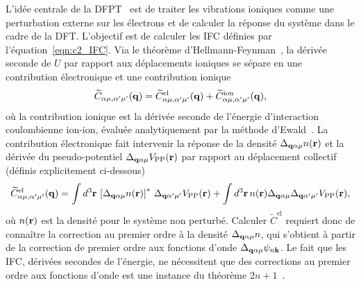 L'idée centrale de la DFPT~\cite{baroniPhononsRelatedCrystal2001a,baroniGreensfunctionApproachLinear1987,gonzeDensityfunctionalApproachNonlinearresponse1989,savrasovLinearresponseTheoryLattice1996} est de traiter les vibrations ioniques comme une perturbation externe sur les électrons et de calculer la réponse du système dans le cadre de la DFT. L'objectif est de calculer les IFC définies par l'équation~\eqref{eqn:c2_IFC}. Via le théorème d'Hellmann-Feynman~\cite{EinfuhrungQuantenchemieHellmann1941,feynmanForcesMolecules1939}, la dérivée seconde de $U$ par rapport aux déplacements ioniques se sépare en une contribution électronique et une contribution ionique
\begin{equation}
    \widetilde{C}_{\alpha\mu,\alpha'\mu'}(\mathbf{q}) = \widetilde{C}^\text{el}_{\alpha\mu,\alpha'\mu'}(\mathbf{q}) + \widetilde{C}^{\text{ion}}_{\alpha\mu,\alpha'\mu'}(\mathbf{q}),
    \label{eqn:IFCq}
\end{equation}
où la contribution ionique est la dérivée seconde de l'énergie d'interaction coulombienne ion-ion, évaluée analytiquement par la méthode d'Ewald~\cite{ewaldBerechnungOptischerUnd1921}. La contribution électronique fait intervenir la réponse de la densité $\Delta_{\mathbf{q}\alpha\mu}n(\mathbf{r})$ et la dérivée du pseudo-potentiel $\Delta_{\mathbf{q}\alpha\mu}V_\text{PP}(\mathbf{r})$ par rapport au déplacement collectif (définis explicitement ci-dessous)
\begin{equation}
    \widetilde{C}^{\text{el}}_{\alpha\mu,\alpha'\mu'}(\mathbf{q}) = \int d^3\mathbf{r}\, \left[\Delta_{\mathbf{q}\alpha\mu}n(\mathbf{r})\right]^*\,\Delta_{\mathbf{q}\alpha'\mu'} V_\text{PP}(\mathbf{r})+\int d^3\mathbf{r}\,n(\mathbf{r})\Delta_{\mathbf{q}\alpha\mu}\Delta_{\mathbf{q}\alpha'\mu'}V_\text{PP}(\mathbf{r})
    ,\label{eqn:C_el}
\end{equation}
où $n(\mathbf{r})$ est la densité pour le système non perturbé. Calculer $\widetilde{C}^\text{el}$ requiert donc de connaître la correction au premier ordre à la densité $\Delta_{\mathbf{q}\alpha\mu}n$, qui s'obtient à partir de la correction de premier ordre aux fonctions d'onde $\Delta_{\mathbf{q}\alpha\mu}\psi_{n\mathbf{k}}$. Le fait que les IFC, dérivées secondes de l'énergie, ne nécessitent que des corrections au premier ordre aux fonctions d'onde est une instance du théorème $2n+1$~\cite{dalgarnoPerturbationCalculationProperties1958,gonzeDensityfunctionalApproachNonlinearresponse1989,gonzeAdiabaticDensityfunctionalPerturbation1995,baroniPhononsRelatedCrystal2001a}.

\bigskip
{}

